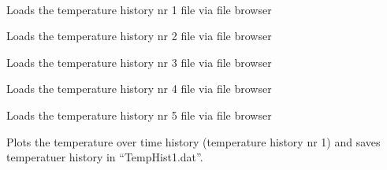 \documentclass[letterpaper,10pt,english]{sphinxmanual}
\begin{document}
\begin{fulllineitems}
\label{GUI:GUI.Ui_PKP}~

\begin{fulllineitems}
\label{GUI:GUI.Ui_PKP.LoadTtFile1}
Loads the temperature history nr 1 file via file browser

\end{fulllineitems}


\begin{fulllineitems}
\label{GUI:GUI.Ui_PKP.LoadTtFile2}
Loads the temperature history nr 2 file via file browser

\end{fulllineitems}


\begin{fulllineitems}
\label{GUI:GUI.Ui_PKP.LoadTtFile3}
Loads the temperature history nr 3 file via file browser

\end{fulllineitems}


\begin{fulllineitems}
\label{GUI:GUI.Ui_PKP.LoadTtFile4}
Loads the temperature history nr 4 file via file browser

\end{fulllineitems}


\begin{fulllineitems}
\label{GUI:GUI.Ui_PKP.LoadTtFile5}
Loads the temperature history nr 5 file via file browser

\end{fulllineitems}


\begin{fulllineitems}
\label{GUI:GUI.Ui_PKP.Plot1}
Plots the temperature over time history (temperature history nr 1) and saves temperatuer history in ``TempHist1.dat''.


\end{fulllineitems}
\end{fulllineitems}
\end{document}
